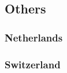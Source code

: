 \documentclass[12pt]{article}
\begin{document}
\subsection{Others}


\subsubsection{Netherlands}

\subsubsection{Switzerland}
\end{document}
